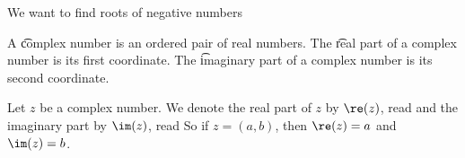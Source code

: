 
\sbasic


















\sstart
{}


We want to find roots of negative numbers


A \t{complex number} is an ordered pair of real numbers.
The \t{real part} of a complex number is its first coordinate.
The \t{imaginary part} of a complex number is its second coordinate.



Let $z$ be a complex number.
We denote the real part of $z$ by $\re(z)$, read  and the imaginary part by $\im(z)$, read 
So if $z = (a, b)$, then $\re(z) = a$ and $\im(z) = b$.
\strats
